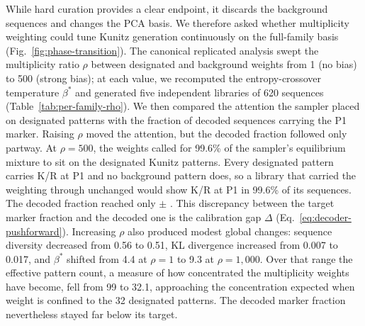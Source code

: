 \DisplayHardCuration

While hard curation provides a clear endpoint, it discards the background sequences and changes
the PCA basis. We therefore asked whether multiplicity weighting could tune Kunitz generation
continuously on the full-family basis (Fig.~\ref{fig:phase-transition}). The canonical
replicated analysis swept the multiplicity ratio $\rho$ between designated and background
weights from 1 (no bias) to 500 (strong bias); at each value, we recomputed the entropy-crossover temperature
$\beta^{*}$ and generated five independent libraries of 620 sequences (Table~\ref{tab:per-family-rho}).
We then compared the attention the sampler placed on designated patterns with the fraction of
decoded sequences carrying the P1 marker. Raising $\rho$ moved the attention, but the decoded
fraction followed only partway. At $\rho=500$, the weights called for 99.6\% of the sampler's
equilibrium mixture to sit on the designated Kunitz patterns. Every designated pattern carries
K/R at P1 and no background pattern does, so a library that carried the weighting through
unchanged would show K/R at P1 in 99.6\% of its sequences. The decoded fraction reached only
\KunitzFobsFiveHundred{} $\pm$ \KunitzFobsFiveHundredSD{}. This discrepancy between the target
marker fraction and the decoded one is the calibration gap $\Delta$
(Eq.~\ref{eq:decoder-pushforward}).
Increasing $\rho$ also produced modest global changes:
sequence diversity decreased from 0.56 to 0.51, KL divergence increased from 0.007 to 0.017,
and $\beta^{*}$ shifted from 4.4 at $\rho=1$ to 9.3 at $\rho=1{,}000$. Over that range the
effective pattern count, a measure of how concentrated the multiplicity
weights have become, fell from 99 to 32.1, approaching the concentration expected when weight
is confined to the 32 designated patterns. The decoded marker fraction nevertheless stayed far
below its target.

